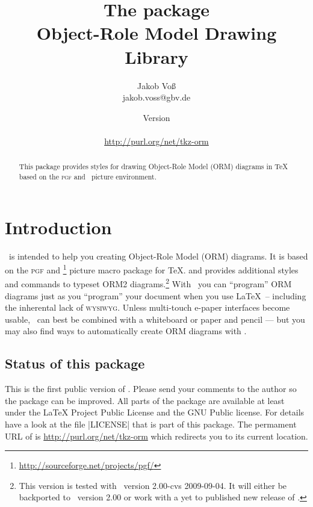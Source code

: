 \documentclass[a4paper,10pt]{article}
\title{The \tkzorm package\\Object-Role Model Drawing Library}
\author{Jakob Vo\ss\\{\footnotesize jakob.voss@gbv.de}}
\date{Version \ormVersion\\\ormDate\\[5mm]\url{http://purl.org/net/tkz-orm}}
\begin{document}
\maketitle

\begin{abstract}
This package provides styles for drawing Object-Role Model (ORM)
diagrams in \TeX{} based on the \textsc{pgf} and \tikzname\ picture environment.
\end{abstract}

\tableofcontents
\pagebreak

\section{Introduction}
\label{sec:introduction}

\tkzorm\ is intended to help you creating Object-Role Model (ORM) diagrams. It is based on the \textsc{pgf} and \tikzname\footnote{\url{http://sourceforge.net/projects/pgf/}} picture macro package for \TeX. and provides additional styles and commands to typeset ORM2 diagrams.\footnote{This version is tested with \tikzname\ version 2.00-cvs 2009-09-04. It will either be backported to \tikzname\ version 2.00 or work with a yet to published new release of \tikzname{}.} With \tkzorm\ you can ``program'' ORM diagrams just as you ``program'' your document when you use \LaTeX\ -- including the inherental lack of \textsc{wysiwyg}. Unless multi-touch e-paper interfaces become usable, \tkzorm\ can best be combined with a whiteboard or paper and pencil --- but you may also find ways to automatically create ORM diagrams with \tkzorm.

\subsection*{Status of this package}
This is the first public version of \tkzorm. Please send your comments to the author so the package can be improved. All parts of the package are available at least under the \LaTeX{} Project Public License\cite{LPPL} and the GNU Public license\cite{GPL2}. For details have a look at the file |LICENSE| that is part of this package. The permament URL of \tkzorm is \url{http://purl.org/net/tkz-orm} which redirects you to its current location.
\end{document}
